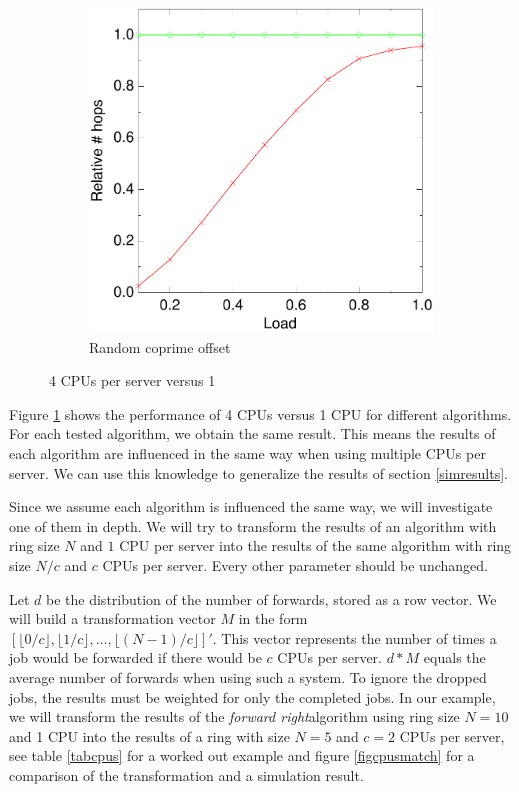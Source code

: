 \documentclass[10pt,a4paper]{article}
\newcommand{\FR}{\textit{forward right\xspace}}
\begin{document}
\begin{figure}
        \vspace*{2em}

        \begin{subfigure}[b]{0.5\textwidth}
                \centering
                \includegraphics[width=\textwidth]{data/4randprimerandprime.pdf}
                \caption{Random coprime offset}
        \end{subfigure}
        \caption{4 CPUs per server versus 1}\label{figcpus}
\end{figure}

Figure \ref{figcpus} shows the performance of 4 CPUs versus 1 CPU for different algorithms. For each tested algorithm, we obtain the same result. This means the results of each algorithm are influenced in the same way when using multiple CPUs per server. We can use this knowledge to generalize the results of section \ref{simresults}.

Since we assume each algorithm is influenced the same way, we will investigate one of them in depth. We will try to transform the results of an algorithm with ring size $N$ and $1$ CPU per server into the results of the same algorithm with ring size $N/c$ and $c$ CPUs per server. Every other parameter should be unchanged.

Let $d$ be the distribution of the number of forwards, stored as a row vector. We will build a transformation vector $M$ in the form $[ \lfloor 0/c \rfloor,  \lfloor 1/c \rfloor, \ldots, \lfloor (N-1)/c \rfloor]'$. This vector represents the number of times a job would be forwarded if there would be $c$ CPUs per server. $d*M$ equals the average number of forwards when using such a system. To ignore the dropped jobs, the results must be weighted for only the completed jobs.
In our example, we will transform the results of the \FR algorithm using ring size $N=10$ and 1 CPU into the results of a ring with size $N=5$ and $c=2$ CPUs per server, see table \ref{tabcpus} for a worked out example and figure \ref{figcpusmatch} for a comparison of the transformation and a simulation result.
\end{document}

